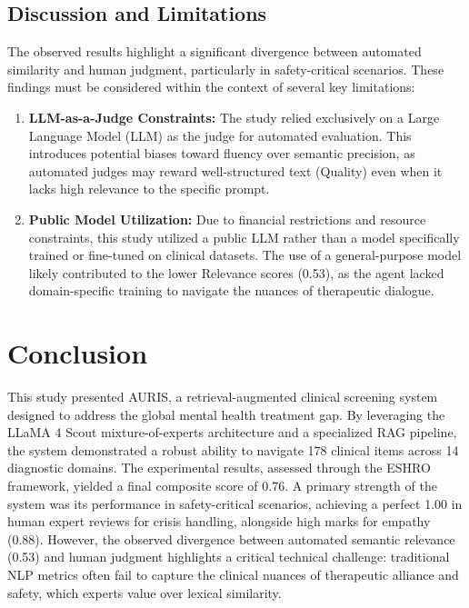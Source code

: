 ﻿\documentclass[acmsmall,screen]{acmart}
\begin{document}
\subsection{Discussion and Limitations}
The observed results highlight a significant divergence between automated similarity and human judgment, particularly in safety-critical scenarios. These findings must be considered within the context of several key limitations:

\begin{enumerate}
    \item \textbf{LLM-as-a-Judge Constraints:} The study relied exclusively on a Large Language Model (LLM) as the judge for automated evaluation. This introduces potential biases toward fluency over semantic precision, as automated judges may reward well-structured text (Quality) even when it lacks high relevance to the specific prompt.
    \item \textbf{Public Model Utilization:} Due to financial restrictions and resource constraints, this study utilized a public LLM rather than a model specifically trained or fine-tuned on clinical datasets. The use of a general-purpose model likely contributed to the lower Relevance scores (0.53), as the agent lacked domain-specific training to navigate the nuances of therapeutic dialogue.
\end{enumerate}

\section{Conclusion}
This study presented AURIS, a retrieval-augmented clinical screening system designed to address the global mental health treatment gap. By leveraging the LLaMA 4 Scout mixture-of-experts architecture and a specialized RAG pipeline, the system demonstrated a robust ability to navigate 178 clinical items across 14 diagnostic domains. The experimental results, assessed through the ESHRO framework, yielded a final composite score of 0.76. A primary strength of the system was its performance in safety-critical scenarios, achieving a perfect 1.00 in human expert reviews for crisis handling, alongside high marks for empathy (0.88). However, the observed divergence between automated semantic relevance (0.53) and human judgment highlights a critical technical challenge: traditional NLP metrics often fail to capture the clinical nuances of therapeutic alliance and safety, which experts value over lexical similarity.
\end{document}

